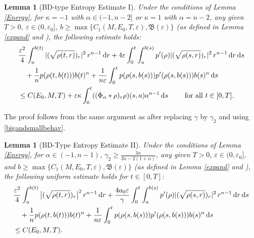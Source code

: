\documentclass[reqno,11pt]{amsart}
\numberwithin{equation}{section}
\newtheorem{lemma}[theorem]{Lemma}
\theoremstyle{definition}
\def\v{\varepsilon}
\def\dd{{\, \rm d}}
\begin{document}
\begin{lemma}[BD-type Entropy Estimate I]\label{oldBD}
Under the conditions of Lemma {\rm \ref{Energy}}, for $\kappa = -1$ with $\alpha \in (-1,n-2]$ 
or $\kappa = 1$ with $\alpha = n-2$, any given $T>0$, $\v\in(0,\v_0]$, 
$b \geq \max\{C_1(M,E_0,T,\varepsilon),\mathfrak{B}(\varepsilon)\}$ {\rm (}as defined in {\rm Lemma \ref{expand}} 
and {\rm \cite[Lemma B.8]{Carrillo2025}}{\rm )}, the following estimate holds{\rm:}
\begin{align*}
\begin{split}
	&\frac{\varepsilon^2}{4}\int_a^{b(t)} |(\sqrt{\rho(t,r)})_r|^2\,r^{n-1} \dd r
	+ 4\varepsilon \int_0^t\int_a^{b(s)} p'(\rho)|(\sqrt{\rho(s,r)})_r|^2\,r^{n-1}\dd r\dd s\\
	&\quad+\frac{1}{n}p(\rho(t,b(t)))b(t)^n
	+\frac{1}{n\varepsilon}\int_0^t p(\rho(s,b(s)))p'(\rho(s,b(s))) b(s)^n\dd s \\
	&\leq C(E_0,M,T) + \varepsilon \kappa \int_0^t ((\Phi_{\alpha} * \rho)_r\rho)(s,a)a^{n-1} \dd s \qquad \text{ for all } t \in [0,T].
 \end{split}
\end{align*}
\end{lemma}

The proof follows from the same argument as \cite[Lemma 3.9]{Carrillo2025} after 
replacing $\gamma$ by $\gamma_2$ and using \eqref{bigandsmallbehav}.

\begin{lemma}[BD-Type Entropy Estimate II]
Under the conditions of {\rm Lemma {\rm \ref{Energy}}}, for $\alpha \in (-1,n-1)$,
$\gamma_2 \geq \frac{3n}{3n - 2(1+\alpha)}$, any given $T > 0$, $\v\in(0,\v_0]$,
and $b \geq \max\{C_1(M,E_0,T,\varepsilon), \mathfrak{B}(\varepsilon)\}$
{\rm (}as defined in {\rm Lemma \ref{expand}} and {\rm \cite[Lemma B.8]{Carrillo2025}}{\rm )},
the following uniform estimate holds for $t \in [0,T]${\rm :}
\begin{align*}
\begin{split}
	&\frac{\varepsilon^2}{4}\int_a^{b(t)} \big|(\sqrt{\rho(t,r)})_r\big|^2\,r^{n-1} \dd r
	+\frac{4 a_0\varepsilon}{\gamma} \int_0^t\int_a^{b(s)} p'(\rho)|(\sqrt{\rho(s,r)})_r|^2\,r^{n-1}\dd r\dd s\\
	&\quad+\frac{1}{n}p(\rho(t,b(t)))b(t)^n
	+\frac{1}{n\varepsilon}\int_0^t p(\rho(s,b(s)))p'(\rho(s,b(s))) b(s)^n\dd s \\
	&\leq C(E_0,M,T).
 \end{split}
\end{align*}
\end{lemma}
\end{document}
